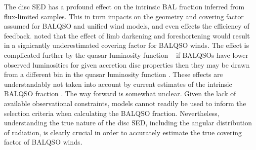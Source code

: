 \documentclass[preprint, a4paper, 11pt]{aastex}
\begin{document}
The disc SED has a profound effect on the intrinsic BAL fraction
inferred from flux-limited samples. This in turn impacts on 
the geometry and covering factor assumed for BALQSO and unified wind models,
and even effects the efficiency of feedback.
\cite{krolik1998} noted that the effect of limb darkening and foreshortening
would result in a signicantly underestimated covering factor for BALQSO winds.
The effect is complicated further by the quasar luminosity function -- if 
BALQSOs have lower observed luminosities for given accretion disc properties 
then they may be drawn from a different bin in the quasar luminosity function 
\citep{goodrich1997}. These effects are understandably not taken into account
by current estimates of the intrinsic BALQSO fraction \citep{weymann1991, reichard2003, knigge2008, turnermiller2009, allen2011}.
The way forward is somewhat unclear. 
Given the lack of available observational constraints, models cannot readily 
be used to inform the selection criteria when calculating the BALQSO fraction.
Nevertheless, understanding the true nature of the disc SED, including the
angular distribution of radiation, is clearly crucial in order
to accurately estimate the true covering factor of BALQSO winds.








\newpage
\end{document}
